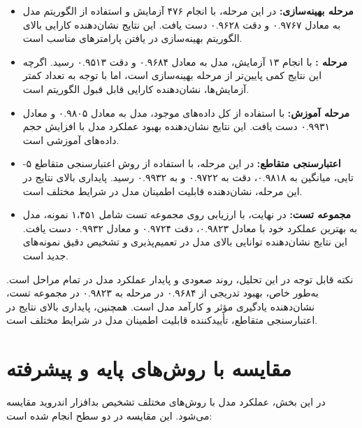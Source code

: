\begin{itemize}
    \renewcommand{\labelitemi}{\lr{$\bullet$}}
    \item \textbf{مرحله بهینه‌سازی:} در این مرحله، با انجام ۴۷۶ آزمایش و استفاده از الگوریتم  مدل به  معادل ۰.۹۷۶۷ و دقت ۰.۹۶۲۸ دست یافت. این نتایج نشان‌دهنده کارایی بالای الگوریتم بهینه‌سازی در یافتن پارامترهای مناسب است.
    
    \item \textbf{مرحله :} با انجام ۱۳ آزمایش، مدل به  معادل ۰.۹۶۸۴ و دقت ۰.۹۵۱۳ رسید. اگرچه این نتایج کمی پایین‌تر از مرحله بهینه‌سازی است، اما با توجه به تعداد کمتر آزمایش‌ها، نشان‌دهنده کارایی قابل قبول الگوریتم  است.
    
    \item \textbf{مرحله آموزش:} با استفاده از کل داده‌های موجود، مدل به  معادل ۰.۹۸۰۵ و  معادل ۰.۹۹۳۱ دست یافت. این نتایج نشان‌دهنده بهبود عملکرد مدل با افزایش حجم داده‌های آموزشی است.
    
    \item \textbf{اعتبارسنجی متقاطع:} در این مرحله، با استفاده از روش اعتبارسنجی متقاطع ۵-تایی، میانگین  به ۰.۹۸۱۸، دقت به ۰.۹۷۲۲ و  به ۰.۹۹۳۲ رسید. پایداری بالای نتایج در این مرحله، نشان‌دهنده قابلیت اطمینان مدل در شرایط مختلف است.
    
    \item \textbf{مجموعه تست:} در نهایت، با ارزیابی روی مجموعه تست شامل ۱،۴۵۱ نمونه، مدل به بهترین عملکرد خود با  معادل ۰.۹۸۲۳، دقت ۰.۹۷۲۴ و  معادل ۰.۹۹۳۲ دست یافت. این نتایج نشان‌دهنده توانایی بالای مدل در تعمیم‌پذیری و تشخیص دقیق نمونه‌های جدید است.
\end{itemize}

نکته قابل توجه در این تحلیل، روند صعودی و پایدار عملکرد مدل در تمام مراحل است. به‌طور خاص، بهبود تدریجی  از ۰.۹۶۸۴ در مرحله  به ۰.۹۸۲۳ در مجموعه تست، نشان‌دهنده یادگیری مؤثر و کارآمد مدل است. همچنین، پایداری بالای نتایج در اعتبارسنجی متقاطع، تأییدکننده قابلیت اطمینان مدل در شرایط مختلف است.

\section{مقایسه با روش‌های پایه و پیشرفته}
در این بخش، عملکرد مدل  با روش‌های مختلف تشخیص بدافزار اندروید مقایسه می‌شود. این مقایسه در دو سطح انجام شده است:

